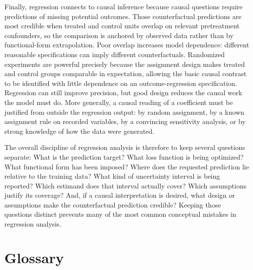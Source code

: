 \documentclass[11pt]{report}
\begin{document}
Finally, regression connects to causal inference because causal questions require predictions of missing potential outcomes. Those counterfactual predictions are most credible when treated and control units overlap on relevant pretreatment confounders, so the comparison is anchored by observed data rather than by functional-form extrapolation. Poor overlap increases model dependence: different reasonable specifications can imply different counterfactuals. Randomized experiments are powerful precisely because the assignment design makes treated and control groups comparable in expectation, allowing the basic causal contrast to be identified with little dependence on an outcome-regression specification. Regression can still improve precision, but good design reduces the causal work the model must do. More generally, a causal reading of a coefficient must be justified from outside the regression output: by random assignment, by a known assignment rule on recorded variables, by a convincing sensitivity analysis, or by strong knowledge of how the data were generated.

The overall discipline of regression analysis is therefore to keep several questions separate: What is the prediction target? What loss function is being optimized? What functional form has been imposed? Where does the requested prediction lie relative to the training data? What kind of uncertainty interval is being reported? Which estimand does that interval actually cover? Which assumptions justify its coverage? And, if a causal interpretation is desired, what design or assumptions make the counterfactual prediction credible? Keeping those questions distinct prevents many of the most common conceptual mistakes in regression analysis.



\appendix
\chapter{Glossary}
\label{app:glossary}
\end{document}
